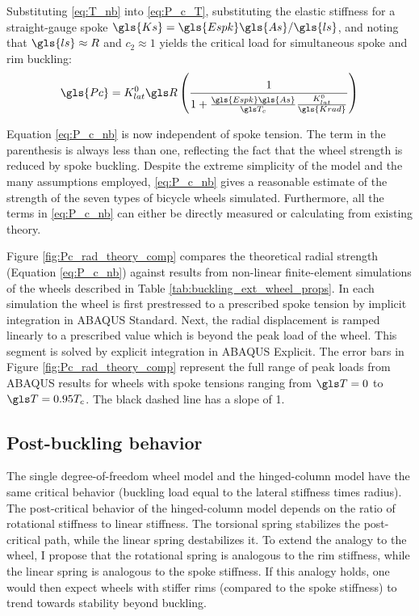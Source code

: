 \documentclass[\rootdir/thesis.tex]{subfiles}
\begin{document}
Substituting \eqref{eq:T_nb} into \eqref{eq:P_c_T}, substituting the elastic stiffness for a straight-gauge spoke $\gls{Ks}=\gls{Espk}\gls{As}/\gls{ls}$, and noting that $\gls{ls} \approx R$ and $c_2\approx 1$ yields the critical load for simultaneous spoke and rim buckling:
\begin{equation}
\label{eq:P_c_nb}
\gls{Pc} = K_{lat}^0 \R \left(\frac{1}{1 + \frac{\gls{Espk}\gls{As}}
						{\T_c}\frac{K_{lat}^0}{\gls{Krad}}}\right)
\end{equation}

Equation \eqref{eq:P_c_nb} is now independent of spoke tension. The term in the parenthesis is always less than one, reflecting the fact that the wheel strength is reduced by spoke buckling. Despite the extreme simplicity of the model and the many assumptions employed, \eqref{eq:P_c_nb} gives a reasonable estimate of the strength of the seven types of bicycle wheels simulated. Furthermore, all the terms in \eqref{eq:P_c_nb} can either be directly measured or calculating from existing theory.

Figure \ref{fig:Pc_rad_theory_comp} compares the theoretical radial strength (Equation \eqref{eq:P_c_nb}) against results from non-linear finite-element simulations of the wheels described in Table \ref{tab:buckling_ext_wheel_props}. In each simulation the wheel is first prestressed to a prescribed spoke tension by implicit integration in ABAQUS Standard. Next, the radial displacement is ramped linearly to a prescribed value which is beyond the peak load of the wheel. This segment is solved by explicit integration in ABAQUS Explicit. The error bars in Figure \ref{fig:Pc_rad_theory_comp} represent the full range of peak loads from ABAQUS results for wheels with spoke tensions ranging from $\T=0$ to $\T=0.95T_c$. The black dashed line has a slope of 1.

\subsection{Post-buckling behavior}

The single degree-of-freedom wheel model and the hinged-column model have the same critical behavior (buckling load equal to the lateral stiffness times radius). The post-critical behavior of the hinged-column model depends on the ratio of rotational stiffness to linear stiffness. The torsional spring stabilizes the post-critical path, while the linear spring destabilizes it. To extend the analogy to the wheel, I propose that the rotational spring is analogous to the rim stiffness, while the linear spring is analogous to the spoke stiffness. If this analogy holds, one would then expect wheels with stiffer rims (compared to the spoke stiffness) to trend towards stability beyond buckling.
\end{document}
